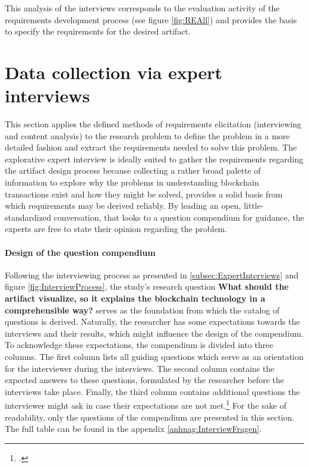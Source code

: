 This analysis of the interviews corresponds to the evaluation activity of the requirements development process (see figure \ref{fig:REAll}) and provides the basis to specify the requirements for the desired artifact. 

\section{Data collection via expert interviews}
This section applies the defined methods of requirements elicitation (interviewing and content analysis) to the research problem to define the problem in a more detailed fashion and extract the requirements needed to solve this problem. 
The explorative expert interview is ideally suited to gather the requirements regarding the artifact design process because collecting a rather broad palette of information to explore why the problems in understanding blockchain transactions exist and how they might be solved, provides a solid basis from which requirements may be derived reliably. By leading an open, little-standardized conversation, that looks to a question compendium for guidance, the experts are free to state their opinion regarding the problem.

\paragraph{Design of the question compendium} Following the interviewing process as presented in \ref{subsec:ExpertInterviews} and figure \ref{fig:InterviewProcess}, the study's research question \textbf{What should the artifact visualize, so it explains the blockchain technology in a comprehensible way?} serves as the foundation from which the catalog of questions is derived. Naturally, the researcher has some expectations towards the interviews and their results, which might influence the design of the compendium. To acknowledge these expectations, the compendium is divided into three columns. The first column lists all guiding questions which serve as an orientation for the interviewer during the interviews. The second column contains the expected answers to these questions, formulated by the researcher before the interviews take place. Finally, the third column contains additional questions the interviewer might ask in case their expectations are not met.\footcite[Cf.][p.431]{AghamanoukjanQualitativeInterviews2007} For the sake of readability, only the questions of the compendium are presented in this section. The full table can be found in the appendix \ref{anhnag:InterviewFragen}.

